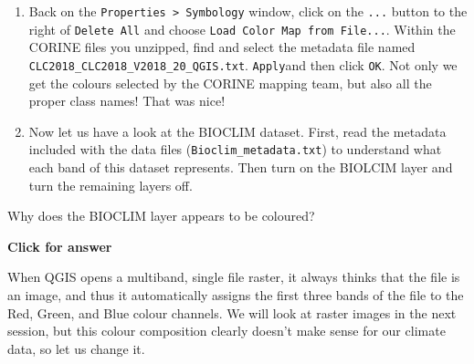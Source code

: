 \documentclass[
  letterpaper,
  DIV=11,
  numbers=noendperiod]{scrreprt}
\begin{document}
\begin{enumerate}
\def\labelenumi{(\arabic{enumi})}
\setcounter{enumi}{136}
\item
  Back on the \texttt{Properties\ \textgreater{}\ Symbology} window,
  click on the \texttt{...} button to the right of \texttt{Delete\ All}
  and choose \texttt{Load\ Color\ Map\ from\ File...}. Within the CORINE
  files you unzipped, find and select the metadata file named
  \texttt{CLC2018\_CLC2018\_V2018\_20\_QGIS.txt}. \texttt{Apply}and then
  click \texttt{OK}. Not only we get the colours selected by the CORINE
  mapping team, but also all the proper class names! That was nice!
\item
  Now let us have a look at the BIOCLIM dataset. First, read the
  metadata included with the data files (\texttt{Bioclim\_metadata.txt})
  to understand what each band of this dataset represents. Then turn on
  the BIOLCIM layer and turn the remaining layers off.
\end{enumerate}

\begin{tcolorbox}[enhanced jigsaw, coltitle=black, toprule=.15mm, breakable, opacitybacktitle=0.6, left=2mm, colback=white, leftrule=.75mm, rightrule=.15mm, colbacktitle=quarto-callout-important-color!10!white, toptitle=1mm, titlerule=0mm, colframe=quarto-callout-important-color-frame, arc=.35mm, bottomtitle=1mm, opacityback=0, bottomrule=.15mm, title=\textcolor{quarto-callout-important-color}{\faExclamation}\hspace{0.5em}{Stop and Think}]

Why does the BIOCLIM layer appears to be coloured?

\end{tcolorbox}

\begin{tcolorbox}[enhanced jigsaw, toprule=.15mm, breakable, left=2mm, colframe=quarto-callout-important-color-frame, colback=white, arc=.35mm, leftrule=.75mm, opacityback=0, rightrule=.15mm, bottomrule=.15mm]

\vspace{-3mm}\textbf{Click for answer}\vspace{3mm}

When QGIS opens a multiband, single file raster, it always thinks that
the file is an image, and thus it automatically assigns the first three
bands of the file to the Red, Green, and Blue colour channels. We will
look at raster images in the next session, but this colour composition
clearly doesn't make sense for our climate data, so let us change it.

\end{tcolorbox}
\end{document}
